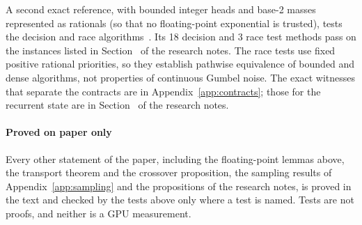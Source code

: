 A second exact reference, with bounded integer heads and base-2 masses represented as rationals (so that no floating-point exponential is trusted), tests the decision and race algorithms~. Its 18 decision and 3 race test methods pass on the instances listed in Section~ of the research notes. The race tests use fixed positive rational priorities, so they establish pathwise equivalence of bounded and dense algorithms, not properties of continuous Gumbel noise. The exact witnesses that separate the contracts are in Appendix~\ref{app:contracts}; those for the recurrent state are in Section~ of the research notes.

\paragraph{Proved on paper only} Every other statement of the paper, including the floating-point lemmas above, the transport theorem and the crossover proposition, the sampling results of Appendix~\ref{app:sampling} and the propositions of the research notes, is proved in the text and checked by the tests above only where a test is named. Tests are not proofs, and neither is a GPU measurement.
